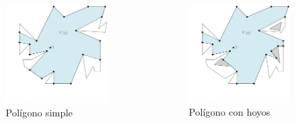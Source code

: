 \documentclass[aspectratio=169,xcolor=dvipsnames, t]{beamer}
\begin{document}
\begin{frame}
    \begin{columns}[t]
        \begin{column}{0.33\textwidth}
            \begin{figure}
                \centering
                \includegraphics[width=0.9\textwidth]{imagenes/Case2.1a.png}
                \caption{Polígono simple}
            \end{figure}
        \end{column}

        \begin{column}{0.33\textwidth}
            \begin{figure}
                \centering
                \includegraphics[width=0.9\textwidth]{imagenes/Case2.1b.png}
                \caption{Polígono con hoyos}
            \end{figure}
        \end{column}


\end{columns}
\end{frame}
\end{document}
